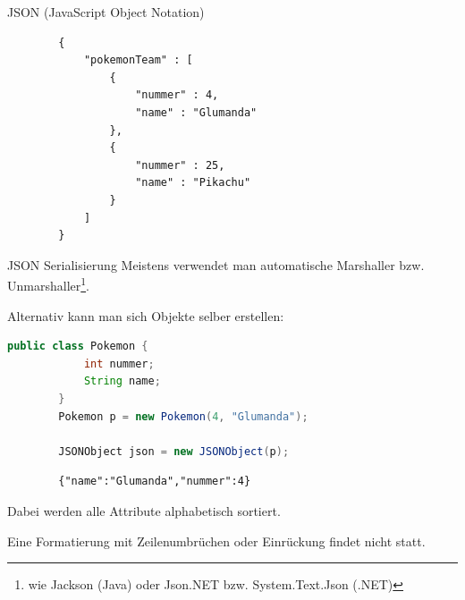 \begin{example}{JSON (JavaScript Object Notation)}
    \begin{lstlisting}
        {
            "pokemonTeam" : [
                {
                    "nummer" : 4,
                    "name" : "Glumanda"
                },
                {
                    "nummer" : 25,
                    "name" : "Pikachu"
                }
            ]
        }
    \end{lstlisting}
\end{example}

\begin{bonus}{JSON Serialisierung}
    Meistens verwendet man automatische Marshaller bzw. Unmarshaller\footnote{wie Jackson (Java) oder Json.NET bzw. System.Text.Json (.NET)}.

    Alternativ kann man sich Objekte selber erstellen:
    \begin{lstlisting}[language=java]
        public class Pokemon {
            int nummer;
            String name;
        }
        Pokemon p = new Pokemon(4, "Glumanda");

        JSONObject json = new JSONObject(p);
    \end{lstlisting}

    \begin{lstlisting}
        {"name":"Glumanda","nummer":4}
    \end{lstlisting}

    Dabei werden alle Attribute alphabetisch sortiert.

    Eine Formatierung mit Zeilenumbrüchen oder Einrückung findet nicht statt.
\end{bonus}